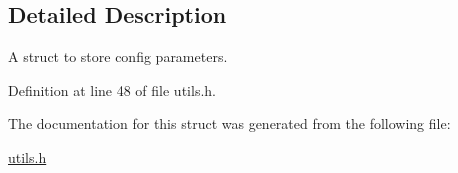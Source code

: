 \subsection{Detailed Description}
A struct to store config parameters. 

Definition at line 48 of file utils.\-h.



The documentation for this struct was generated from the following file\-:\begin{DoxyCompactItemize}
\item 
\hyperlink{utils_8h}{utils.\-h}\end{DoxyCompactItemize}
